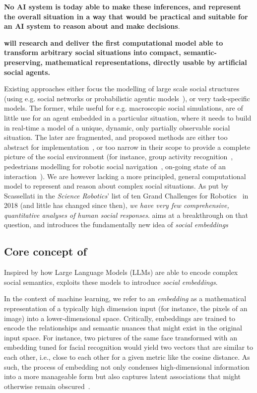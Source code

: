 \textbf{No AI system is today able to make these inferences, and represent the overall
situation in a way that would be practical and suitable for an AI system to
reason about and make decisions}.

\begin{framed}

\bf\noindent \project will research and deliver the first computational model
able to transform arbitrary social situations into compact,
semantic-preserving, mathematical representations, directly usable by
artificial social agents.
\end{framed}

Existing approaches either focus the modelling of large scale social structures
(using e.g. social networks or probabilistic agentic
models~\cite{nunes2014social}), or very task-specific models. The former, while
useful for e.g. macroscopic social simulations, are of little use for an agent
embedded in a particular situation, where it needs to build in real-time a model
of a unique, dynamic, only partially observable social situation. The later are
fragmented, and proposed methods are either too abstract for
implementation~\cite{gordon2016commonsense}, or too narrow in their scope to
provide a complete picture of the social environment (for instance, group
activity recognition~\cite{shu2017cern,wu2019learning}, pedestrians modelling
for robotic social navigation~\cite{alahi2016social}, on-going state of an
interaction~\cite{garcía2020explainable}). We are however lacking a more
principled, general computational model to represent and reason about complex
social situations. As put by Scassellati in the \emph{Science Robotics}' list of
ten Grand Challenges for Robotics~\cite{yang2018grand} in 2018 (and little has
changed since then), \emph{we have very few comprehensive, quantitative analyses
of human social responses}. \project aims at a breakthrough on that question, and introduces the
fundamentally new idea of \emph{social embeddings}


\subsection{Core concept of \project}

Inspired by how Large Language Models (LLMs) are able to encode complex social
semantics, \project exploits these models to introduce \emph{social embeddings}.

In the context of machine learning, we refer to an \emph{embedding} as a
mathematical representation of a typically high dimension input (for instance,
the pixels of an image) into a lower-dimensional space. Critically, embeddings
are trained to encode the relationships and semantic nuances that might exist in
the original input space. For instance, two pictures of the same face
transformed with an embedding tuned for facial recognition would yield two
vectors that are similar to each other, i.e., close to each other for a given
metric like the cosine distance. As such, the process of embedding not
only condenses high-dimensional information into a more manageable form but also
captures latent associations that might otherwise remain
obscured~\cite{bengio2009learning}.

